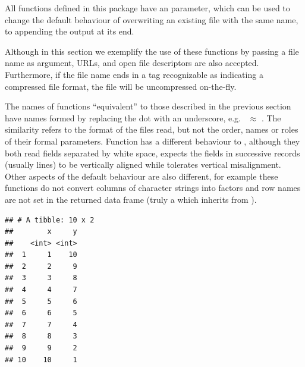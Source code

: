 \documentclass[krantz2,ChapterTOCs]{krantz}\usepackage{knitr}
\begin{document}
All  functions defined in this package have an  parameter, which can be used to change the default behaviour of overwriting an existing file with the same name, to appending the output at its end.

Although in this section we exemplify the use of these functions by passing a file name as argument, URLs, and open file descriptors are also accepted. Furthermore, if the file name ends in a tag recognizable as indicating a compressed file format, the file will be uncompressed on-the-fly.

\begin{warningbox}
The names of functions ``equivalent'' to those described in the previous section have names formed by replacing the dot with an underscore, e.g.\  $\approx$ . The similarity refers to the format of the files read, but not the order, names or roles of their formal parameters. Function  has a different behaviour to , although they both read fields separated by white space,  expects the fields in successive records (usually lines) to be vertically aligned while  tolerates vertical misalignment. Other aspects of the default behaviour are also different, for example these functions do not convert columns of character strings into factors and row names are not set in the returned data frame (truly a  which inherits from ).
\end{warningbox}

\begin{knitrout}\footnotesize
{}\color{fgcolor}\begin{kframe}
\begin{alltt}
\hlstd{(} \hlstd{=} \hlstd{)}
\end{alltt}


{\ttfamily\noindent\itshape\color{messagecolor}{\#\# Parsed with column specification:\\\#\# cols(\\\#\#\ \  x = col\_integer(),\\\#\#\ \  y = col\_integer()\\\#\# )}}\begin{verbatim}
## # A tibble: 10 x 2
##        x     y
##    <int> <int>
##  1     1    10
##  2     2     9
##  3     3     8
##  4     4     7
##  5     5     6
##  6     6     5
##  7     7     4
##  8     8     3
##  9     9     2
## 10    10     1
\end{verbatim}
\end{kframe}
\end{knitrout}
\end{document}
